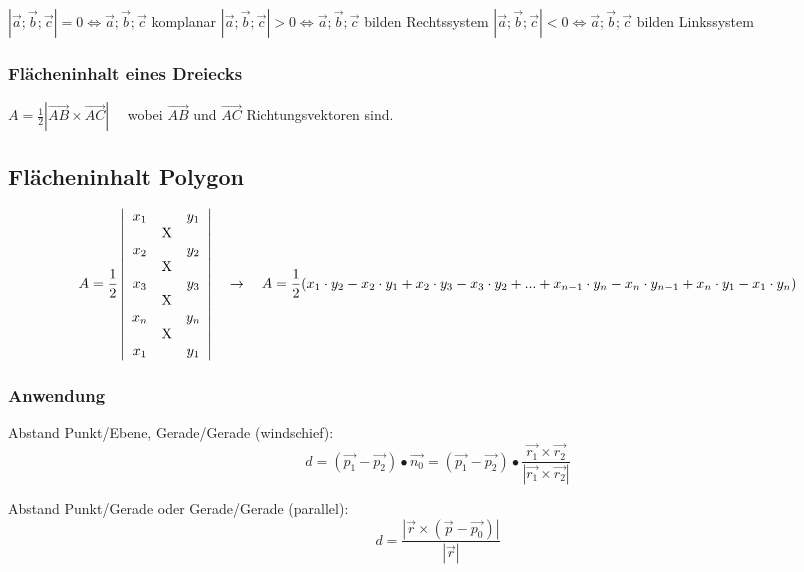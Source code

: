 		$|\vec{a}; \vec{b}; \vec{c}| = 0 \Leftrightarrow \vec{a}; \vec{b}; \vec{c}$ komplanar \qquad 
		$|\vec{a}; \vec{b}; \vec{c}| > 0 \Leftrightarrow \vec{a}; \vec{b}; \vec{c}$ bilden Rechtssystem \qquad
		$|\vec{a}; \vec{b}; \vec{c}| < 0 \Leftrightarrow \vec{a}; \vec{b}; \vec{c}$ bilden Linkssystem

	\subsubsection{Flächeninhalt eines Dreiecks}
		$A=\frac{1}{2}|\vec{AB}\times\vec{AC}|$ \ \ wobei $\vec{AB}$ und $\vec{AC}$ Richtungsvektoren sind.
	\subsection{Flächeninhalt Polygon}
	\begin{equation*}
		A = \frac{1}{2} \left|
		\begin{array}{ccc}
			x_1 & & y_1\\
			& $X$ &\\
			x_2 & & y_2\\
			& $X$ &\\
			x_3 & & y_3\\
			& $X$ &\\
			x_n & & y_n\\
			& $X$ &\\
			x_1 & & y_1\\
		\end{array}
		\right|
		\quad \rightarrow \quad
		A = \frac{1}{2}(
		x_1 \cdot y_2 - x_2 \cdot y_1 + 
		x_2 \cdot y_3 - x_3 \cdot y_2 + ... +
		x_{n-1} \cdot y_n - x_n \cdot y_{n-1} +
		x_n \cdot y_1 - x_1 \cdot y_n) 
	\end{equation*}
	\subsubsection{Anwendung}
		Abstand Punkt/Ebene, Gerade/Gerade (windschief):
		\begin{equation*}
			d = (\vec{p_1} - \vec{p_2}) \bullet \vec{n_0} = (\vec{p_1} - \vec{p_2}) \bullet \frac{\vec{r_1} \times \vec{r_2}}{|\vec{r_1} \times \vec{r_2}|}
		\end{equation*} 

		Abstand Punkt/Gerade oder Gerade/Gerade (parallel):
		\begin{equation*}
			d = \frac{|\vec{r} \times (\vec{p} - \vec{p_0})|}{|\vec{r}|}
		\end{equation*}